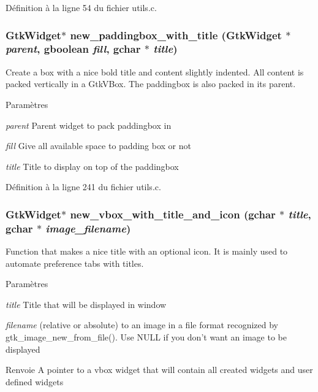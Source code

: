 Définition à la ligne 54 du fichier utils.c.

\subsubsection[{new\_\-paddingbox\_\-with\_\-title}]{\setlength{\rightskip}{0pt plus 5cm}GtkWidget$\ast$ new\_\-paddingbox\_\-with\_\-title (GtkWidget $\ast$ {\em parent}, \/  gboolean {\em fill}, \/  gchar $\ast$ {\em title})}\label{utils_8h_a22ba81fcf046b5bec6cf6d55d440abc5}
Create a box with a nice bold title and content slightly indented. All content is packed vertically in a GtkVBox. The paddingbox is also packed in its parent.


\begin{DoxyParams}{Paramètres}
\item[{\em parent}]Parent widget to pack paddingbox in \item[{\em fill}]Give all available space to padding box or not \item[{\em title}]Title to display on top of the paddingbox \end{DoxyParams}


Définition à la ligne 241 du fichier utils.c.

\subsubsection[{new\_\-vbox\_\-with\_\-title\_\-and\_\-icon}]{\setlength{\rightskip}{0pt plus 5cm}GtkWidget$\ast$ new\_\-vbox\_\-with\_\-title\_\-and\_\-icon (gchar $\ast$ {\em title}, \/  gchar $\ast$ {\em image\_\-filename})}\label{utils_8h_a3baab3fba6974f2ebf35757198ac8911}
Function that makes a nice title with an optional icon. It is mainly used to automate preference tabs with titles.


\begin{DoxyParams}{Paramètres}
\item[{\em title}]Title that will be displayed in window \item[{\em filename}](relative or absolute) to an image in a file format recognized by gtk\_\-image\_\-new\_\-from\_\-file(). Use NULL if you don't want an image to be displayed\end{DoxyParams}
\begin{DoxyReturn}{Renvoie}
A pointer to a vbox widget that will contain all created widgets and user defined widgets 
\end{DoxyReturn}


